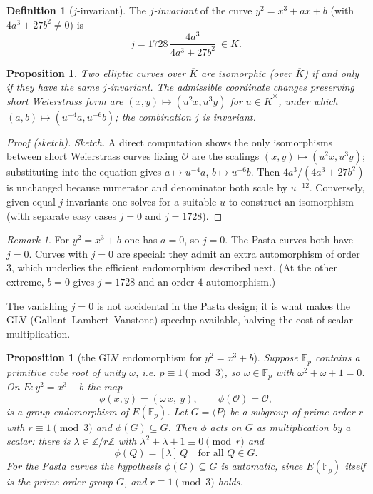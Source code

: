 \documentclass[11pt,a4paper]{article}
\newtheorem{proposition}[theorem]{Proposition}
\theoremstyle{definition}
\newtheorem{definition}[theorem]{Definition}
\theoremstyle{remark}
\newtheorem{remark}[theorem]{Remark}
\newcommand{\Z}{\ensuremath{\mathbb{Z}}}
\newcommand{\Fp}{\ensuremath{\mathbb{F}_{p}}}
\begin{document}
\begin{definition}[\(j\)-invariant]\label{ellipticcurves:def-jinvariant}
The \emph{\(j\)-invariant} of the curve \(y^2 = x^3 + ax + b\) (with \(4a^3 + 27 b^2 \neq 0\)) is
\[
  j = 1728\,\frac{4 a^3}{4 a^3 + 27 b^2}\ \in K .
\]
\end{definition}

\begin{proposition}\label{ellipticcurves:prop-jinvariant}
Two elliptic curves over \(\overline{K}\) are isomorphic (over \(\overline{K}\)) if and only if they have the same \(j\)-invariant. The admissible coordinate changes preserving short Weierstrass form are \((x, y) \mapsto (u^2 x, u^3 y)\) for \(u \in \overline{K}^{\times}\), under which \((a, b) \mapsto (u^{-4} a, u^{-6} b)\); the combination \(j\) is invariant.
\end{proposition}

\begin{proof}[Proof (sketch)]
\emph{Sketch.} A direct computation shows the only isomorphisms between short Weierstrass curves fixing \(\mathcal{O}\) are the scalings \((x,y)\mapsto (u^2 x, u^3 y)\); substituting into the equation gives \(a \mapsto u^{-4}a\), \(b\mapsto u^{-6}b\). Then \(4a^3/(4a^3 + 27b^2)\) is unchanged because numerator and denominator both scale by \(u^{-12}\). Conversely, given equal \(j\)-invariants one solves for a suitable \(u\) to construct an isomorphism (with separate easy cases \(j = 0\) and \(j = 1728\)).
\end{proof}

\begin{remark}\label{ellipticcurves:rem-pasta-j}
For \(y^2 = x^3 + b\) one has \(a = 0\), so \(j = 0\). The Pasta curves both have \(j = 0\). Curves with \(j = 0\) are special: they admit an extra automorphism of order \(3\), which underlies the efficient endomorphism described next. (At the other extreme, \(b = 0\) gives \(j = 1728\) and an order-\(4\) automorphism.)
\end{remark}

The vanishing \(j = 0\) is not accidental in the Pasta design; it is what makes the GLV (Gallant--Lambert--Vanstone) speedup available, halving the cost of scalar multiplication.

\begin{proposition}[the GLV endomorphism for \(y^2 = x^3 + b\)]\label{ellipticcurves:prop-glv}
Suppose \(\Fp\) contains a primitive cube root of unity \(\omega\), i.e. \(p \equiv 1 \pmod 3\), so \(\omega \in \Fp\) with \(\omega^2 + \omega + 1 = 0\). On \(E : y^2 = x^3 + b\) the map
\[
  \phi(x, y) = (\omega\, x,\ y), \qquad \phi(\mathcal{O}) = \mathcal{O},
\]
is a group endomorphism of \(E(\Fp)\). Let \(G = \langle P\rangle\) be a subgroup of prime order \(r\) with \(r \equiv 1 \pmod 3\) and \(\phi(G) \subseteq G\). Then \(\phi\) acts on \(G\) as multiplication by a scalar: there is \(\lambda \in \Z/r\Z\) with \(\lambda^2 + \lambda + 1 \equiv 0 \pmod r\) and
\[
  \phi(Q) = [\lambda]\,Q \quad\text{for all } Q \in G .
\]
For the Pasta curves the hypothesis \(\phi(G) \subseteq G\) is automatic, since \(E(\Fp)\) itself is the prime-order group \(G\), and \(r \equiv 1 \pmod 3\) holds.
\end{proposition}
\end{document}
